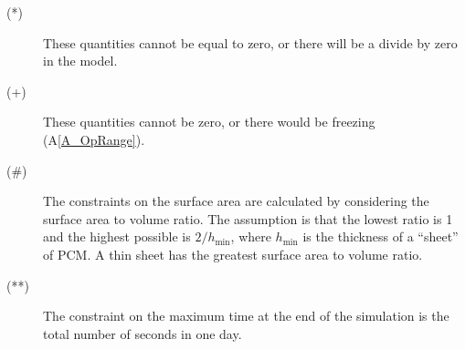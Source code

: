 \documentclass[12pt]{article}
\newcommand{\aref}[1]{A\ref{#1}}
\begin{document}
\noindent 
\begin{description}
\item[(*)] These quantities cannot be equal to zero, or there will be a divide
  by zero in the model.
\item[(+)] These quantities cannot be zero, or there would be freezing
  (\aref{A_OpRange}).
\item[(\#)] The constraints on the surface area are calculated by considering
  the surface area to volume ratio.  The assumption is that the lowest ratio is
  1 and the highest possible is $2/h_\text{min}$, where $h_\text{min}$ is the
  thickness of a ``sheet'' of PCM.  A thin sheet has the greatest surface area to
  volume ratio.
\item[(**)] The constraint on the maximum time at the end of the simulation is 
	the total number of seconds in one day.

\end{description}
\end{document}
